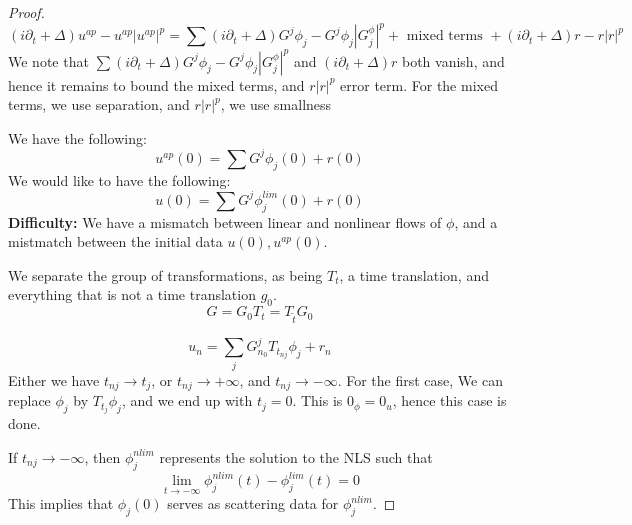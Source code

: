 \begin{proof}
    \begin{equation*}
        (i\partial_t+\Delta)u^{ap}-u^{ap}|u^{ap}|^p=\sum(i\partial_t+\Delta)G^j\phi_j-G^j\phi_j|G^\phi_j|^p+ \text{ mixed terms }+ (i\partial_t+\Delta)r-r|r|^p
    \end{equation*}
    We note that $\sum(i\partial_t+\Delta)G^j\phi_j-G^j\phi_j|G^\phi_j|^p$ and $(i\partial_t+\Delta)r$ both vanish, and hence it remains to bound the mixed terms, and $r|r|^p$ error term. For the mixed terms, we use separation, and $r|r|^p$, we use smallness

    We have the following:
    \begin{equation*}
        u^{ap}(0)=\sum G^j\phi_j(0)+r(0)
    \end{equation*}
    We would like to have the following:
    \begin{equation*}
        u(0)=\sum G^j\phi_j^{lim}(0)+r(0)
    \end{equation*}
    \textbf{Difficulty:} We have a mismatch between linear and nonlinear flows of $\phi$, and  a mistmatch between the initial data $u(0), u^{ap}(0)$.

    We separate the group of transformations, as being $T_t$, a time translation, and everything that is not a time translation $g_0$.
    \begin{equation*}
        G=G_0T_t=T_{\tilde{t}}G_0
    \end{equation*}

    \begin{equation*}
        u_n=\sum_j G_{n_0}^jT_{t_{nj}}\phi_j+r_n
    \end{equation*}
    Either we have $t_{nj}\to t_j$, or $t_{nj}\to+\infty$, and $t_{nj}\to -\infty$. For the first case, We can replace $\phi_j$ by $T_{t_j}\phi_j$, and we end up with $t_j=0$. This is $0_\phi=0_u$, hence this case is done.

    If $t_{nj}\to-\infty$, then $\phi_j^{nlim}$ represents the solution to the NLS such that
    \begin{equation*}
        \lim_{t\to-\infty}\phi_j^{nlim}(t)-\phi_j^{lim}(t)=0
    \end{equation*}
    This implies that $\phi_j(0)$ serves as scattering data for $\phi_j^{nlim}$. 


\end{proof}
